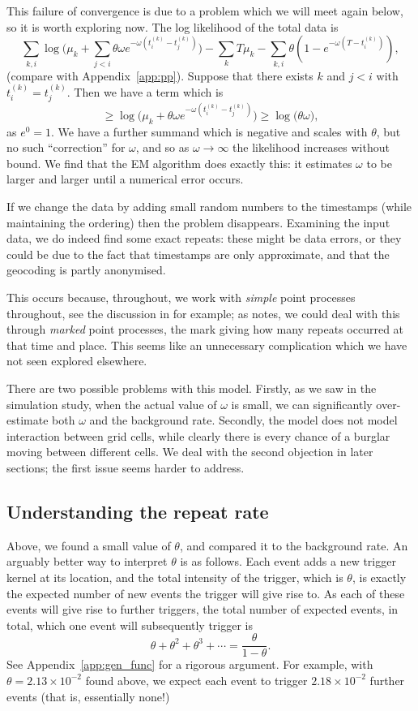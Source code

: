 \documentclass[twoside,a4paper]{article}
\theoremstyle{plain}
\theoremstyle{definition}
\begin{document}
This failure of convergence is due to a problem which we will meet again below, so it
is worth exploring now.  The log likelihood of the total data is
\[ \sum_{k,i} \log\Big( \mu_k + \sum_{j<i} \theta\omega e^{-\omega(t^{(k)}_i - t^{(k)}_j)} \Big)
- \sum_k T\mu_k - \sum_{k,i} \theta(1-e^{-\omega(T-t^{(k)}_i)}), \]
(compare with Appendix~\ref{app:pp}).  Suppose that there exists $k$ and $j<i$ with
$t^{(k)}_i = t^{(k)}_j$.  Then we have a term which is
\[ \geq \log\Big( \mu_k + \theta \omega e^{-\omega(t^{(k)}_i - t^{(k)}_j)} \Big)
\geq \log( \theta\omega \big), \]
as $e^0 = 1$.  We have a further summand which is negative and scales with $\theta$, 
but no such ``correction'' for $\omega$, and so as $\omega\rightarrow\infty$ the
likelihood increases without bound.  We find that the EM algorithm does exactly this:
it estimates $\omega$ to be larger and larger until a numerical error occurs.

If we change the data by adding small random numbers to the timestamps (while maintaining
the ordering) then the problem disappears.  Examining the input data, we do indeed find
some exact repeats: these might be data errors, or they could be due to the fact that
timestamps are only approximate, and that the geocoding is partly anonymised.

This occurs because, throughout, we work with \emph{simple} point processes throughout,
see the discussion in \cite[Section~8.2.7]{cressie} for example; as \cite{cressie}
notes, we could deal with this through \emph{marked} point processes, the mark giving how
many repeats occurred at that time and place.  This seems like an unnecessary complication
which we have not seen explored elsewhere.

There are two possible problems with this model.  Firstly, as we saw in the simulation study,
when the actual value of $\omega$ is small, we can significantly over-estimate both
$\omega$ and the background rate.  Secondly, the model does not model interaction between
grid cells, while clearly there is every chance of a burglar moving between different cells.
We deal with the second objection in later sections; the first issue seems harder to address.


\subsection{Understanding the repeat rate}

Above, we found a small value of $\theta$, and compared it to the background rate.
An arguably better way to interpret $\theta$ is as follows.  Each event adds a new trigger
kernel at its location, and the total intensity of the trigger, which is $\theta$, is exactly
the expected number of new events the trigger will give rise to.  As each of these events
will give rise to further triggers, the total number of expected events, in total, which one
event will subsequently trigger is
\[ \theta + \theta^2 + \theta^3 + \cdots = \frac{\theta}{1-\theta}. \]
See Appendix~\ref{app:gen_func} for a rigorous argument.  For example, with $\theta=2.13
\times 10^{-2}$ found above, we expect each event to trigger $2.18\times 10^{-2}$ further
events (that is, essentially none!)
\end{document}
